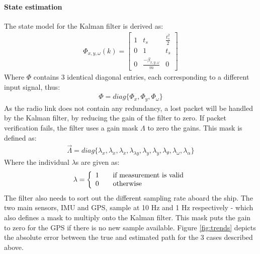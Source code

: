 \documentclass[a0,portrait]{a0poster}
\begin{document}
\begin{center}
{\paragraph{State estimation}
The state model for the Kalman filter is derived as:
\begin{align}
\Phi_{x,y,\omega}(k) = \begin{bmatrix}
1 & t_s & \frac{t_s^2}{2}\\
0 & 1 & t_s\\
0 & \frac{-\beta_{x,y,\omega}}{m} & 0
\end{bmatrix}
\end{align}
Where $\Phi$ contains 3 identical diagonal entries, each corresponding to a different input signal, thus:
\begin{align}
\Phi = diag\{\Phi_x,\Phi_y,\Phi_\omega\}
\end{align}
As the radio link does not contain any redundancy, a lost packet will be handled by the Kalman filter, by reducing the gain of the filter to zero. If packet verification fails, the filter uses a gain mask $\Lambda$ to zero the gains. This mask is defined as:
\begin{align}
\vec{\Lambda} = diag\{\lambda_x,\lambda_{\dot{x}},\lambda_{\ddot{x}},\lambda_{\lambda{y}},\lambda_{\dot{y}},\lambda_{\ddot{y}},\lambda_{\theta},\lambda_{\omega},\lambda_{\alpha} \}
\end{align}
Where the individual $\lambda$s are given as:
\begin{align}
\lambda = 
\left\{ 
  \begin{array}{l l}
    1 & \quad \text{if measurement is valid}\\
    0 & \quad \text{otherwise}
  \end{array} \right.
\end{align} 
The filter also needs to sort out the different sampling rate aboard the ship. The two main sensors, IMU and GPS, sample at 10 Hz and 1 Hz respectively - which also defines a mask to multiply onto the Kalman filter. This mask puts the gain to zero for the GPS if there is no new sample available. Figure \vref{fig:trends} depicts the absolute error between the true and estimated path for the 3 cases described above. 

}
\end{center}
\end{document}
